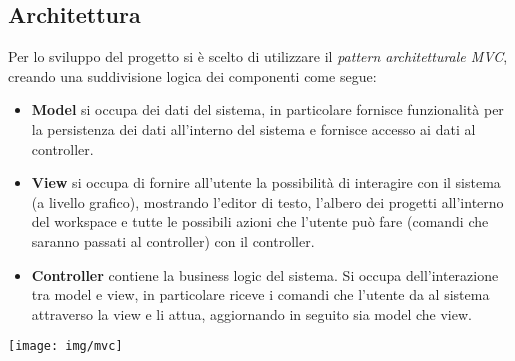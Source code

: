 \documentclass{article}
\begin{document}
  \subsection{Architettura}
  Per lo sviluppo del progetto si è scelto di utilizzare il \textit{pattern architetturale MVC}, creando una suddivisione logica dei componenti come segue:
  \begin{itemize}
    \item \textbf{Model} si occupa dei dati del sistema, in particolare fornisce funzionalità per la persistenza dei dati all'interno del sistema e fornisce
    accesso ai dati al controller.
    \item \textbf{View} si occupa di fornire all'utente la possibilità di interagire con il sistema (a livello grafico), mostrando l'editor
    di testo, l'albero dei progetti all'interno del workspace e tutte le possibili azioni che l'utente può fare (comandi che saranno passati al controller)
    con il controller.
    \item \textbf{Controller} contiene la business logic del sistema. Si occupa dell'interazione tra model e view, in particolare riceve i comandi che l'utente da al sistema
    attraverso la view e li attua, aggiornando in seguito sia model che view.
  \end{itemize}
  \begin{framed}
    \centering
    \begin{center}
      \texttt{[image: img/mvc]}
    \end{center}
  \end{framed}
\end{document}
